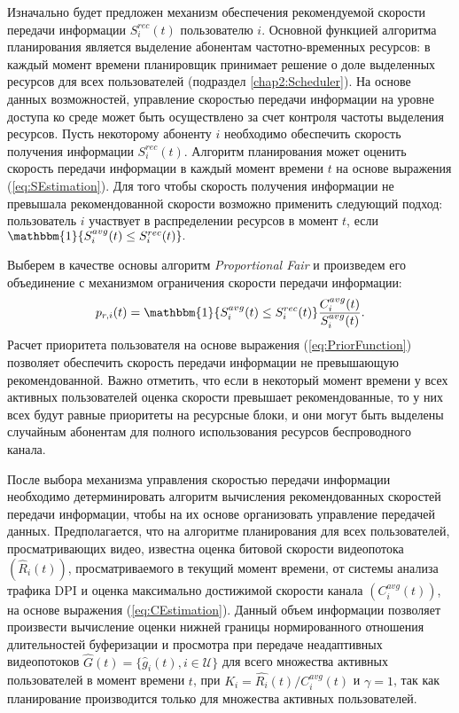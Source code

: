 Изначально будет предложен механизм обеспечения рекомендуемой скорости передачи информации $S^{rec}_i(t)$ пользователю $i$. Основной функцией алгоритма планирования является выделение абонентам частотно-временных ресурсов: в каждый момент времени планировщик принимает решение о доле выделенных ресурсов для всех пользователей (подраздел \ref{chap2:Scheduler}). На основе данных возможностей, управление скоростью передачи информации на уровне доступа ко среде может быть осуществлено за счет контроля частоты выделения ресурсов. Пусть некоторому абоненту $i$ необходимо обеспечить скорость получения информации $S^{rec}_i(t)$. Алгоритм планирования может оценить скорость передачи информации в каждый момент времени $t$ на основе выражения (\ref{eq:SEstimation}). Для того чтобы скорость получения информации не превышала рекомендованной скорости возможно применить следующий подход: пользователь $i$ участвует в распределении ресурсов в момент $t$, если $\mathbbm{1}\{S_i^{avg}(t) \leq S^{rec}_i(t)\}.$

Выберем в качестве основы алгоритм \textit{Proportional Fair} и произведем его объединение с механизмом ограничения скорости передачи информации:
\begin{equation}
\label{eq:PriorFunction}
p_{r,i}(t) = \mathbbm{1}\{S_i^{avg}(t) \leq S^{rec}_i(t)\}\frac{C_i^{avg}(t)}{S_i^{avg}(t)}.
\end{equation}
Расчет приоритета пользователя на основе выражения (\ref{eq:PriorFunction}) позволяет обеспечить скорость передачи информации не превышающую рекомендованной. Важно отметить, что если в некоторый момент времени у всех активных пользователей оценка скорости превышает рекомендованные, то у них всех будут равные приоритеты на ресурсные блоки, и они могут быть выделены случайным абонентам для полного использования ресурсов беспроводного канала.

После выбора механизма управления скоростью передачи информации необходимо детерминировать алгоритм вычисления рекомендованных скоростей передачи информации, чтобы на их основе организовать управление передачей данных. Предполагается, что на алгоритме планирования для всех пользователей, просматривающих видео, известна оценка битовой скорости видеопотока $\left(\hat{R}_i(t)\right)$, просматриваемого в текущий момент времени, от системы анализа трафика DPI и оценка максимально достижимой скорости канала $\left(C^{avg}_i(t)\right)$, на основе выражения (\ref{eq:CEstimation}). Данный объем информации позволяет произвести вычисление оценки нижней границы нормированного отношения длительностей буферизации и просмотра при передаче неадаптивных видеопотоков $\hat{G}(t) = \{\hat{g}_i(t), i \in \mathcal{U}\}$ для всего множества активных пользователей в момент времени $t$, при $K_i = \hat{R_i}(t) / C^{avg}_i(t)$ и $\gamma = 1$, так как планирование производится только для множества активных пользователей.

